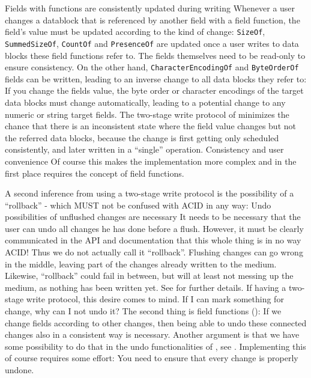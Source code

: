 {%
Fields with functions are consistently updated during writing 
}
{%
Whenever a user changes a datablock that is referenced by another field with a field function, the field's value must be updated according to the kind of change: \texttt{SizeOf}, \texttt{SummedSizeOf}, \texttt{CountOf} and \texttt{PresenceOf} are updated once a user writes to data blocks these field functions refer to. The fields themselves need to be read-only to ensure consistency. On the other hand, \texttt{CharacterEncodingOf} and \texttt{ByteOrderOf} fields can be written, leading to an inverse change to all data blocks they refer to: If you change the fields value, the byte order or character encodings of the target data blocks must change automatically, leading to a potential change to any numeric or string target fields. The two-stage write protocol of  minimizes the chance that there is an inconsistent state where the field value changes but not the referred data blocks, because the change is first getting only scheduled consistently, and later written in a ``single'' operation. 
}
{%
Consistency and user convenience
}
{%
Of course this makes the implementation more complex and in the first place requires the concept of field functions.
}

A second inference from using a two-stage write protocol is the possibility of a ``rollback'' - which MUST not be confused with ACID in any way:
{%
Undo possibilities of unflushed changes are necessary
}
{%
It needs to be necessary that the user can undo all changes he has done before a flush. However, it must be clearly communicated in the API and documentation that this whole thing is in no way ACID! Thus we do not actually call it ``rollback''. Flushing changes can go wrong in the middle, leaving part of the changes already written to the medium. Likewise, ``rollback'' could fail in between, but will at least not messing up the medium, as nothing has been written yet. See  for further details.
}
{%
If having a two-stage write protocol, this desire comes to mind. If I can mark something for change, why can I not undo it? The second thing is field functions (): If we change fields according to other changes, then being able to undo these connected changes also in a consistent way is necessary. Another argument is that we have some possibility to do that in the undo functionalities of \COMPmedia{}, see .
}
{%
Implementing this of course requires some effort: You need to ensure that every change is properly undone.
}

